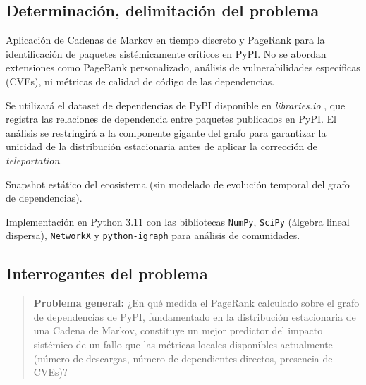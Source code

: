 \subsection{Determinación, delimitación del problema}

\begin{description}[style=nextline]
    \item[Temática]
        Aplicación de Cadenas de Markov en tiempo discreto y PageRank para la
        identificación de paquetes sistémicamente críticos en PyPI. No se abordan
        extensiones como PageRank personalizado, análisis de vulnerabilidades
        específicas (CVEs), ni métricas de calidad de código de las dependencias.

    \item[Datos]
        Se utilizará el dataset de dependencias de PyPI disponible en
        \textit{libraries.io} \autocite{librariesio}, que registra las relaciones
        de dependencia entre paquetes publicados en PyPI. El análisis se
        restringirá a la componente gigante del grafo para garantizar la
        unicidad de la distribución estacionaria antes de aplicar la corrección
        de \textit{teleportation}.

    \item[Temporal]
        Snapshot estático del ecosistema (sin modelado de evolución temporal
        del grafo de dependencias).

    \item[Computacional]
        Implementación en Python 3.11 con las bibliotecas \texttt{NumPy},
        \texttt{SciPy} (álgebra lineal dispersa), \texttt{NetworkX} y
        \texttt{python-igraph} para análisis de comunidades.
\end{description}

\subsection{Interrogantes del problema}

\begin{quote}
\textbf{Problema general:}
¿En qué medida el PageRank calculado sobre el grafo de dependencias de PyPI,
fundamentado en la distribución estacionaria de una Cadena de Markov, constituye
un mejor predictor del impacto sistémico de un fallo que las métricas locales
disponibles actualmente (número de descargas, número de dependientes directos,
presencia de CVEs)?
\end{quote}

